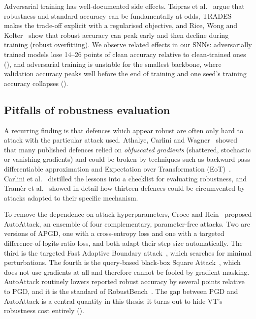 Adversarial training has well-documented side effects. Tsipras et al.~\cite{tsipras2019robustness} argue that robustness and standard accuracy can be fundamentally at odds, TRADES~\cite{zhang2019theoretically} makes the trade-off explicit with a regularised objective, and Rice, Wong and Kolter~\cite{rice2020overfitting} show that robust accuracy can peak early and then decline during training (robust overfitting). We observe related effects in our SNNs: adversarially trained models lose 14--26 points of clean accuracy relative to clean-trained ones (), and adversarial training is unstable for the smallest backbone, where validation accuracy peaks well before the end of training and one seed's training accuracy collapses ().

\subsection{Pitfalls of robustness evaluation}

A recurring finding is that defences which appear robust are often only hard to attack with the particular attack used. Athalye, Carlini and Wagner~\cite{athalye2018obfuscated} showed that many published defences relied on \emph{obfuscated gradients} (shattered, stochastic or vanishing gradients) and could be broken by techniques such as backward-pass differentiable approximation and Expectation over Transformation (EoT)~\cite{athalye2018synthesizing}. Carlini et al.~\cite{carlini2019evaluating} distilled the lessons into a checklist for evaluating robustness, and Tram\`er et al.~\cite{tramer2020adaptive} showed in detail how thirteen defences could be circumvented by attacks adapted to their specific mechanism.

To remove the dependence on attack hyperparameters, Croce and Hein~\cite{croce2020reliable} proposed AutoAttack, an ensemble of four complementary, parameter-free attacks. Two are versions of APGD, one with a cross-entropy loss and one with a targeted difference-of-logits-ratio loss, and both adapt their step size automatically. The third is the targeted Fast Adaptive Boundary attack~\cite{croce2020minimally}, which searches for minimal perturbations. The fourth is the query-based black-box Square Attack~\cite{andriushchenko2020square}, which does not use gradients at all and therefore cannot be fooled by gradient masking. AutoAttack routinely lowers reported robust accuracy by several points relative to PGD, and it is the standard of RobustBench~\cite{croce2021robustbench}. The gap between PGD and AutoAttack is a central quantity in this thesis: it turns out to hide VT's robustness cost entirely ().

